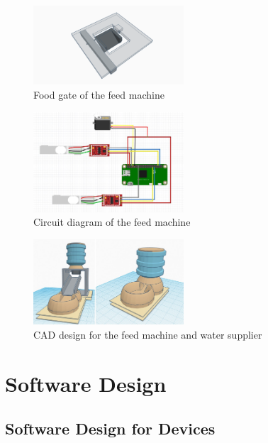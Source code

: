 \documentclass[conference]{IEEEtran}
\begin{document}
\begin{figure}[htbp]
\centerline{\includegraphics[width=0.5\textwidth]{./images/servo_gate.png}}
\caption{Food gate of the feed machine}
\label{fig}
\end{figure}

\begin{figure}[htbp]
\centerline{\includegraphics[width=0.5\textwidth]{./images/feed machine circuit.jpg}}
\caption{Circuit diagram of the feed machine}
\label{fig}
\end{figure}

\begin{figure}[htbp]
\centerline{\includegraphics[width=0.5\textwidth]{./images/Feed Machine & Water Supplier.jpg}}
\caption{CAD design for the feed machine and water supplier}
\label{fig}
\end{figure}

\section{Software Design}
\subsection{Software Design for Devices}
\end{document}
